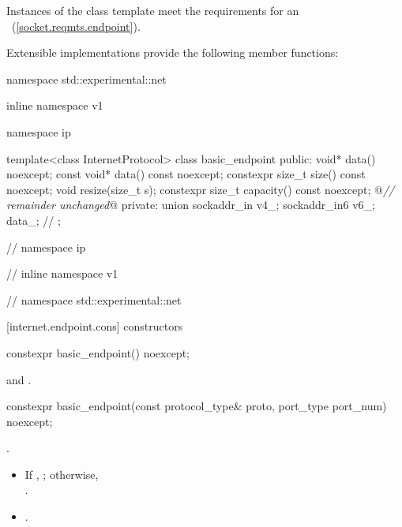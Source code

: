 \pnum
Instances of the  class template meet the requirements for an ~(\ref{socket.reqmts.endpoint}).

%
\pnum
 Extensible implementations provide the following member functions:

\begin{codeblock}
namespace std::experimental::net {
inline namespace v1 {
namespace ip {

  template<class InternetProtocol>
  class basic_endpoint
  {
  public:
    void* data() noexcept;
    const void* data() const noexcept;
    constexpr size_t size() const noexcept;
    void resize(size_t s);
    constexpr size_t capacity() const noexcept;
    @\textit{// remainder unchanged}@
  private:
    union
    {
      sockaddr_in v4_;
      sockaddr_in6 v6_;
    } data_; // \expos
  };

} // namespace ip
} // inline namespace v1
} // namespace std::experimental::net
\end{codeblock}


[internet.endpoint.cons]{ constructors}

\begin{itemdecl}
constexpr basic_endpoint() noexcept;
\end{itemdecl}

\begin{itemdescr}
\pnum
\postconditions {} and .
\end{itemdescr}

\begin{itemdecl}
constexpr basic_endpoint(const protocol_type& proto,
                         port_type port_num) noexcept;
\end{itemdecl}

\begin{itemdescr}
\pnum
\requires {}.

\pnum
\postconditions
\begin{itemize}
\item
If , ; otherwise,\\
.
\item
{}.
\end{itemize}
\end{itemdescr}

